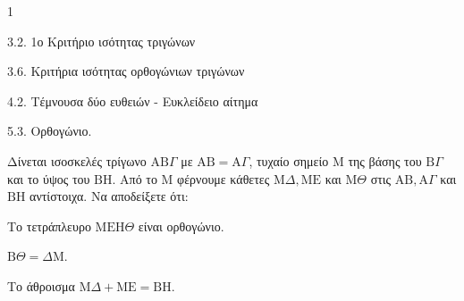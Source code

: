 \begin{ylh}{1}
    \item 3.2. 1ο Κριτήριο ισότητας τριγώνων
    \item 3.6. Κριτήρια ισότητας ορθογώνιων τριγώνων
    \item 4.2. Τέμνουσα δύο ευθειών - Ευκλείδειο αίτημα
    \item 5.3. Ορθογώνιο.
\end{ylh}
Δίνεται ισοσκελές τρίγωνο $\mathrm{A}\mathrm{B}\Gamma$ με $\mathrm{A}\mathrm{B} = \mathrm{A}\Gamma$, τυχαίο σημείο $\mathrm{M}$ της βάσης του $\mathrm{B}\Gamma$ και το ύψος του $\mathrm{B}\mathrm{H}$. Από το $\mathrm{M}$ φέρνουμε κάθετες $\mathrm{M}\Delta, \mathrm{M}\mathrm{E}$ και $\mathrm{M}\Theta$ στις $\mathrm{A}\mathrm{B}, \mathrm{A}\Gamma$ και $\mathrm{B}\mathrm{H}$ αντίστοιχα.
Να αποδείξετε ότι:
\begin{alist}
    \item Το τετράπλευρο $\mathrm{M}\mathrm{E}\mathrm{H}\Theta$ είναι ορθογώνιο. 
    \item $\mathrm{B}\Theta = \Delta\mathrm{M}$. 
    \item Το άθροισμα $\mathrm{M}\Delta + \mathrm{M}\mathrm{E} = \mathrm{B}\mathrm{H}$. 
\end{alist}
